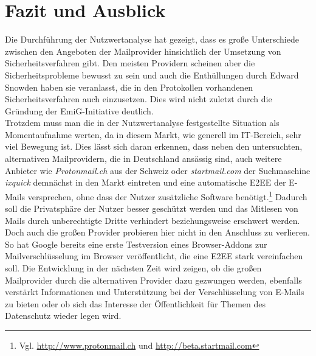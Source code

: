 \documentclass  [paper=a4,
				fontsize=12pt,
				listof=totoc,
				bibliography=totoc
				]{scrreprt}
\begin{document}
	\chapter{Fazit und Ausblick}
		\color{black}
		Die Durchführung der Nutzwertanalyse hat gezeigt, dass es große Unterschiede zwischen den Angeboten der Mailprovider hinsichtlich der Umsetzung von Sicherheitsverfahren gibt.
		Den meisten Providern scheinen aber die Sicherheitsprobleme bewusst zu sein und auch die Enthüllungen durch Edward Snowden haben sie veranlasst, die in den Protokollen vorhandenen Sicherheitsverfahren auch einzusetzen.
		Dies wird nicht zuletzt durch die Gründung der \ac{EmiG}-Initiative deutlich.\medskip\\
		Trotzdem muss man die in der Nutzwertanalyse festgestellte Situation als Momentaufnahme werten, da in diesem Markt, wie generell im IT-Bereich, sehr viel Bewegung ist.
		Dies lässt sich daran erkennen, dass neben den untersuchten, alternativen Mailprovidern, die in Deutschland ansässig sind, auch weitere Anbieter wie \textit{Protonmail.ch} aus der Schweiz oder \textit{startmail.com} der Suchmaschine \textit{ixquick} demnächst in den Markt eintreten und eine automatische \ac{E2EE} der E-Mails versprechen, ohne dass der Nutzer zusätzliche Software benötigt.\footnote{Vgl. \url{http://www.protonmail.ch} und \url{http://beta.startmail.com}}
		Dadurch soll die Privatsphäre der Nutzer besser geschützt werden und das Mitlesen von Mails durch unberechtigte Dritte verhindert beziehungsweise erschwert werden.\medskip\\
		Doch auch die großen Provider probieren hier nicht in den Anschluss zu verlieren.
		So hat Google bereits eine erste Testversion eines Browser-Addons zur Mailverschlüsselung im Browser veröffentlicht, die eine \ac{E2EE} stark vereinfachen soll.		
		Die Entwicklung in der nächsten Zeit wird zeigen, ob die großen Mailprovider durch die alternativen Provider dazu gezwungen werden, ebenfalls verstärkt Informationen und Unterstützung bei der Verschlüsselung von E-Mails zu bieten oder ob sich das Interesse der Öffentlichkeit für Themen des Datenschutz wieder legen wird.\medskip\\
\end{document}
